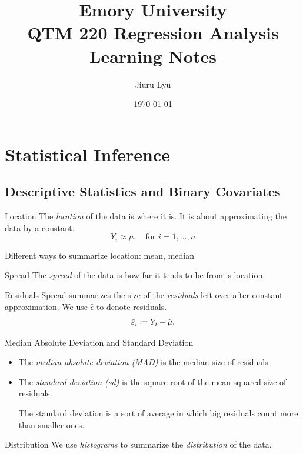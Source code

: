 

\title{Emory University\\\textbf{QTM 220 Regression Analysis}\\ Learning Notes}
\author{Jiuru Lyu}
\date{\today}


\maketitle

\tableofcontents

\newpage
\section{Statistical Inference}
\subsection{Descriptive Statistics and Binary Covariates}
\begin{df}{Location}
	The \textit{location} of the data is where it is. It is about approximating the data by a constant. \[Y_i\approx\mu,\quad\text{for }i=1,\dots,n\]	
\end{df}
\begin{eg}
	Different ways to summarize location: mean, median
\end{eg}
\begin{df}{Spread}
	The \textit{spread} of the data is how far it tends to be from is location. 	
\end{df}
\begin{df}{Residuals}
	Spread summarizes the size of the \textit{residuals} left over after constant approximation. We use $\hat\epsilon$ to denote residuals. \[\hat{\varepsilon}_i\coloneqq Y_i-\hat\mu.\]
\end{df}
\begin{df}{Median Absolute Deviation and Standard Deviation}
	\begin{itemize}
		\item The \textit{median absolute deviation (MAD)} is the median size of residuals.
		\item The \textit{standard deviation (sd)} is the square root of the mean squared size of residuals. 
		\begin{rmk}The standard deviation is a sort of average in which big residuals count more than smaller ones. \end{rmk}
	\end{itemize}
\end{df}
\begin{df}{Distribution}
	We use \textit{histograms} to summarize the \textit{distribution} of the data. 
\end{df}
